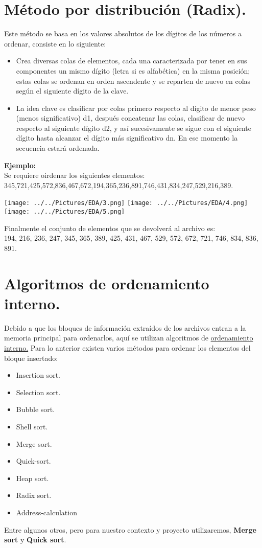 \documentclass[12pt,letterpaper]{report}
\begin{document}
\section*{Método por distribución (Radix).}
Este método se basa en los valores absolutos de los dígitos de los números a ordenar, consiste en lo siguiente:\\
\begin{itemize}
	\item Crea diversas colas de elementos, cada una caracterizada por tener en sus componentes un mismo dígito (letra si es alfabética) en la misma posición; estas colas se ordenan en orden ascendente y se reparten de nuevo en colas según el siguiente dígito de la clave.
	\item La idea clave es clasificar por colas primero respecto al dígito de menor peso (menos significativo) d1, después concatenar las colas, clasificar de nuevo respecto al siguiente dígito d2, y así sucesivamente se sigue con el siguiente dígito hasta alcanzar el dígito más significativo dn. En ese momento la secuencia estará ordenada.
\end{itemize}
\textbf{Ejemplo:} \\ Se requiere oirdenar los siguientes elementos: \\ 345,721,425,572,836,467,672,194,365,236,891,746,431,834,247,529,216,389.\\
\begin{center}
\texttt{[image: ../../Pictures/EDA/3.png]} 
\texttt{[image: ../../Pictures/EDA/4.png]} 
\texttt{[image: ../../Pictures/EDA/5.png]} 
\end{center}
Finalmente el conjunto de elementos que se devolverá al archivo es:\\
194, 216, 236, 247, 345, 365, 389, 425, 431, 467, 529, 572, 672, 721, 746, 834, 836, 891.\\
\section*{Algoritmos de ordenamiento interno.}
Debido a que los bloques de información extraídos de los archivos entran a la memoria principal para ordenarlos, aquí se utilizan algoritmos de \underline{ordenamiento interno.} Para lo anterior existen varios métodos para ordenar los elementos del bloque insertado:
\begin{itemize}
	\item Insertion sort.
	\item Selection sort.
	\item Bubble sort.
	\item Shell sort.
	\item Merge sort.
	\item Quick-sort.
	\item Heap sort.
	\item Radix sort.
	\item Address-calculation
\end{itemize}
Entre algunos otros, pero para nuestro contexto y proyecto utilizaremos, \textbf{Merge sort} y \textbf{Quick sort}.
\end{document}
